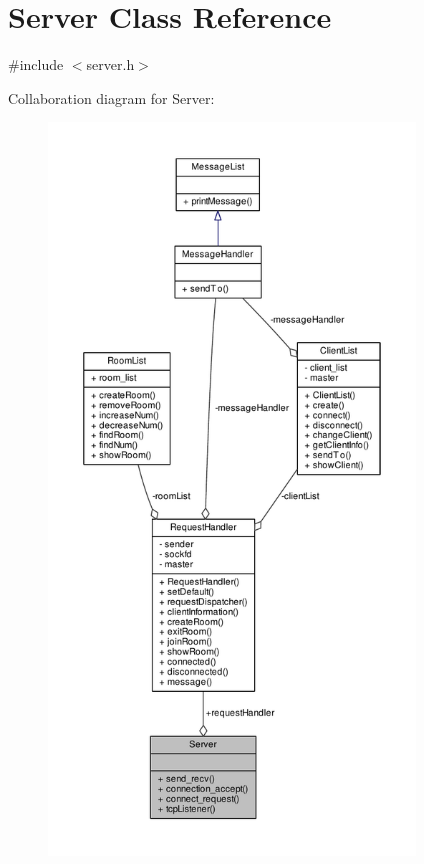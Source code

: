 \hypertarget{class_server}{}\section{Server Class Reference}
\label{class_server}


{\ttfamily \#include $<$server.\+h$>$}



Collaboration diagram for Server\+:
\nopagebreak
\begin{figure}[H]
\begin{center}
\leavevmode
\includegraphics[height=550pt]{class_server__coll__graph}
\end{center}
\end{figure}

